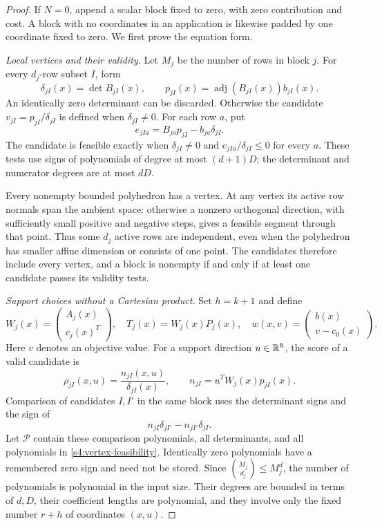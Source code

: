\begin{proof}
If $N=0$, append a scalar block fixed to zero, with zero contribution
and cost. A block with no coordinates in an application is likewise
padded by one coordinate fixed to zero. We first prove the equation form.

\emph{Local vertices and their validity.}
Let $M_j$ be the number of rows in block $j$. For every $d_j$-row
subset $I$, form
\[
 \delta_{jI}(x)=\det B_{jI}(x),\qquad
 p_{jI}(x)=\operatorname{adj}(B_{jI}(x))b_{jI}(x).
\]
An identically zero determinant can be discarded. Otherwise the
candidate $v_{jI}=p_{jI}/\delta_{jI}$ is defined when
$\delta_{jI}\ne0$. For each row $a$, put
\begin{equation}
 e_{jIa}=B_{ja}p_{jI}-b_{ja}\delta_{jI}.
 \label{s4:vertex-feasibility}
\end{equation}
The candidate is feasible exactly when $\delta_{jI}\ne0$ and
$e_{jIa}/\delta_{jI}\le0$ for every $a$. These tests use signs of
polynomials of degree at most $(d+1)D$; the determinant and numerator
degrees are at most $dD$.

Every nonempty bounded polyhedron has a vertex. At any vertex its
active row normals span the ambient space: otherwise a nonzero
orthogonal direction, with sufficiently small positive and negative
steps, gives a feasible segment through that point. Thus some $d_j$
active rows are independent, even when the polyhedron has smaller
affine dimension or consists of one point. The candidates therefore
include every vertex, and a block is nonempty if and only if at least
one candidate passes its validity tests.

\emph{Support choices without a Cartesian product.}
Set $h=k+1$ and define
\[
 W_j(x)=\begin{pmatrix}A_j(x)\\c_j(x)^T\end{pmatrix},\quad
 T_j(x)=W_j(x)P_j(x),\quad
 w(x,v)=\begin{pmatrix}b(x)\\v-c_0(x)\end{pmatrix}.
\]
Here $v$ denotes an objective value. For a support direction
$u\in\mathbb R^h$, the score of a valid candidate is
\[
 \rho_{jI}(x,u)=\frac{n_{jI}(x,u)}{\delta_{jI}(x)},\qquad
 n_{jI}=u^TW_j(x)p_{jI}(x).
\]
Comparison of candidates $I,I'$ in the same block uses the determinant
signs and the sign of
\begin{equation}
 n_{jI}\delta_{jI'}-n_{jI'}\delta_{jI}.
 \label{s4:score-comparison}
\end{equation}
Let $\mathcal P$ contain these comparison polynomials, all determinants,
and all polynomials in \eqref{s4:vertex-feasibility}. Identically zero
polynomials have a remembered zero sign and need not be stored. Since
$\binom{M_j}{d_j}\le M_j^d$, the number of polynomials is polynomial
in the input size. Their degrees are bounded in terms of $d,D$, their
coefficient lengths are polynomial, and they involve only the fixed
number $r+h$ of coordinates $(x,u)$.


\end{proof}
